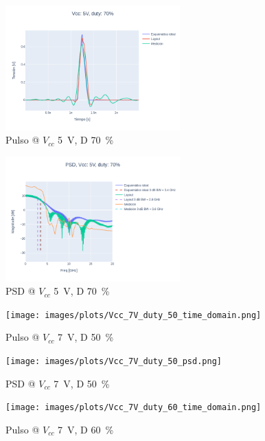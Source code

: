 \begin{figure}
  \centering
    \includegraphics[width=0.6\textwidth]{images/plots/Vcc_5V_duty_70_time_domain.png}
    \caption{Pulso @ $V_{cc}$ \qty{5}{\volt}, D \qty{70}{\percent} }
    \label{fig:plots_5v_70}
\end{figure}

\begin{figure}
  \centering
    \includegraphics[width=0.6\textwidth]{images/plots/Vcc_5V_duty_70_psd.png}
    \caption{PSD @ $V_{cc}$ \qty{5}{\volt}, D \qty{70}{\percent} }
    \label{fig:psd_5v_70}
\end{figure}

\begin{figure}
  \centering
    \texttt{[image: images/plots/Vcc\_7V\_duty\_50\_time\_domain.png]}
    \caption{Pulso @ $V_{cc}$ \qty{7}{\volt}, D \qty{50}{\percent} }
    \label{fig:plots_7v_50}
\end{figure}

\begin{figure}
  \centering
    \texttt{[image: images/plots/Vcc\_7V\_duty\_50\_psd.png]}
    \caption{PSD @ $V_{cc}$ \qty{7}{\volt}, D \qty{50}{\percent} }
    \label{fig:psd_7v_50}
\end{figure}

\begin{figure}
  \centering
    \texttt{[image: images/plots/Vcc\_7V\_duty\_60\_time\_domain.png]}
    \caption{Pulso @ $V_{cc}$ \qty{7}{\volt}, D \qty{60}{\percent} }
    \label{fig:plots_7v_60}
\end{figure}

